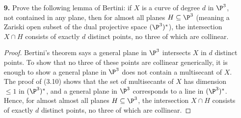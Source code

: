 \documentclass[a4paper]{article}
\begin{document}
\begin{enumerate} [label=\textbf{\arabic*.}, leftmargin=0em]
\begin{proof}
\begin{itemize} [leftmargin=0cm]
            \item[(b)] Let $\fI$ be the ideal sheaf of $X$ in $\P^3$, and consider the exact sequence
                  \[ \begin{tikzcd}
                      0 \arrow[r] & \fI \arrow[r] & \fO_{\P^3} \arrow[r] & \fO_X \arrow[r] & 0.
                    \end{tikzcd} \]
                  Twisting by $\fO_{\P_3}(2)$ and taking cohomology gives
                  \[ \begin{tikzcd}
                      0 \arrow[r] & \cH^0(\P^3, \fI(2)) \arrow[r] & \cH^0(\P^3, \fO_{\P^3}(2)) \arrow[r] & \cH^0(X, \fO_X(2)) \arrow[r] & \cdots.
                    \end{tikzcd} \]
                  Now, $X$ is an elliptic curve, and $\fO_X(2)$ corresponds to a divisor $D$ of degree 8.
                  The Riemann Roch theorem gives $\dim \cH^0(X, \fO_X(2)) = 8$, and the vector space in the middle has dimension 10, so we conclude that $h^0(\P^3, \fI(2)) \geq 2$.
                  An element of $\cH^0(\P^3, \fI(2))$ is a form of degree 2, whose zero-set is a quadric surface containing $X$.
                  Any such quadric must be irreducible and reduced because $X$ is not contained in any hyperplane.
                  Hence, $X$ is contained in two distinct irreducible quadric surfaces and is a complete intersection because $X$ is a curve of degree 4.
          \end{itemize}
        \end{proof}

  \item[\textbf{9.}] Prove the following lemma of Bertini: if $X$ is a curve of degree $d$ in $\P^3$, not contained in any plane, then for almost all planes $H \subseteq \P^3$ (meaning a Zariski open subset of the dual projective space $(\P^3)^*$), the intersection $X \cap H$ consists of exactly $d$ distinct points, no three of which are collinear.

        \begin{proof}
          Bertini's theorem says a general plane in $\P^3$ intersects $X$ in $d$ distinct points.
          To show that no three of these points are collinear generically, it is enough to show a general plane in $\P^3$ does not contain a multisecant of $X$.
          The proof of (3.10) shows that the set of multisecants of $X$ has dimension $\leq 1$ in $(\P^3)^*$, and a general plane in $\P^3$ corresponds to a line in $(\P^3)^*$.
          Hence, for almost almost all planes $H \subseteq \P^3$, the intersection $X \cap H$ consists of exactly $d$ distinct points, no three of which are collinear.
        \end{proof}


\end{enumerate}
\end{document}
